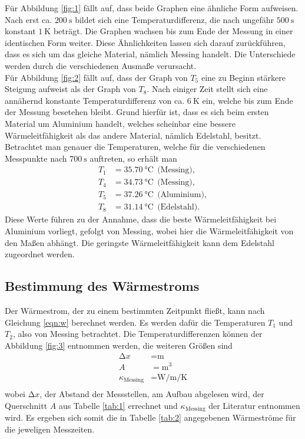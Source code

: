 Für Abbildung \ref{fig:1} fällt auf, dass beide Graphen eine ähnliche Form aufweisen.
Nach erst ca. $\SI{200}{\second}$ bildet sich eine Temperaturdifferenz, die nach ungefähr $\SI{500}{\second}$ konstant $\SI{1}{\kelvin}$ beträgt.
Die Graphen wachsen bis zum Ende der Messung in einer identischen Form weiter.
Diese Ähnlichkeiten lassen sich darauf zurückführen, dass es sich um das gleiche Material, nämlich Messing handelt.
Die Unterschiede werden durch die verschiedenen Ausmaße verursacht.\\
Für Abbildung \ref{fig:2} fällt auf, dass der Graph von $T_5$ eine zu Beginn stärkere Steigung aufweist als der Graph von $T_8$.
Nach einiger Zeit stellt sich eine annähernd konstante Temperaturdifferenz von ca. $\SI{6}{\kelvin}$ ein, welche bis zum Ende der Messung besetehen bleibt.
Grund hierfür ist, dass es sich beim ersten Material um Aluminium handelt, welches scheinbar eine bessere Wärmeleitfähigkeit als das andere Material, nämlich Edelstahl, besitzt.\\
Betrachtet man genauer die Temperaturen, welche für die verschiedenen Messpunkte nach $\SI{700}{\second}$ auftreten, so erhält man
\begin{align*}
  T_1 &= \SI{35.70}{\celsius}  \:\: \text{(Messing)}, \\
  T_4 &= \SI{34.73}{\celsius} \:\: \text{(Messing)}, \\
  T_5 &= \SI{37.26}{\celsius} \:\: \text{(Aluminium)}, \\
  T_8 &= \SI{31.14}{\celsius} \:\: \text{(Edelstahl}).
\end{align*}
Diese Werte führen zu der Annahme, dass die beste Wärmeleitfähigkeit bei Aluminium vorliegt, gefolgt von Messing, wobei hier die Wärmeleitfähigkeit von den Maßen abhängt.
Die geringste Wärmeleitfähigkeit kann dem Edelstahl zugeordnet werden.\\


\subsection{Bestimmung des Wärmestroms}


Der Wärmestrom, der zu einem bestimmten Zeitpunkt fließt, kann nach Gleichung \ref{eqn:w} berechnet werden.
Es werden dafür die Temperaturen $T_1$ und $T_2$, also von Messing betrachtet.
Die Temperaturdifferenzen können der Abbildung \ref{fig:3} entnommen werden, die weiteren Größen sind
\begin{align*}
  \increment{x} &= \si{\metre} \\
  A &= \si{\metre\tothe{3}} \\
  \kappa_\text{Messing} &= \si{\watt\per\metre\per\kelvin} \\
\end{align*}
wobei $\increment{x}$, der Abstand der Messstellen, am Aufbau abgelesen wird, der Querschnitt $A$ aus Tabelle \ref{tab:1} errechnet und $\kappa_\text{Messing}$ der Literatur entnommen wird.
Es ergeben sich somit die in Tabelle \ref{tab:2} angegebenen Wärmeströme für die jeweligen Messzeiten.

